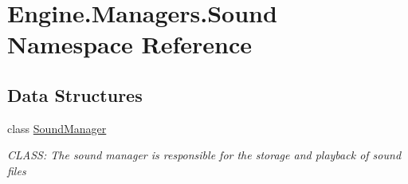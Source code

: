 \hypertarget{a00275}{}\section{Engine.\+Managers.\+Sound Namespace Reference}
\label{a00275}
\subsection*{Data Structures}
\begin{DoxyCompactItemize}
\item 
class \hyperlink{a00546}{Sound\+Manager}
\begin{DoxyCompactList}\small\item\em C\+L\+A\+SS\+: The sound manager is responsible for the storage and playback of sound files \end{DoxyCompactList}\end{DoxyCompactItemize}
